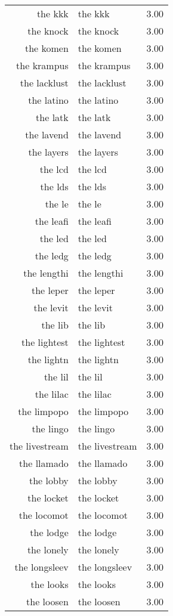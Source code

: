 \begin{table}[ht]
\begin{tabular}{rlr}
  the kkk & the kkk & 3.00 \\ 
  the knock & the knock & 3.00 \\ 
  the komen & the komen & 3.00 \\ 
  the krampus & the krampus & 3.00 \\ 
  the lacklust & the lacklust & 3.00 \\ 
  the latino & the latino & 3.00 \\ 
  the latk & the latk & 3.00 \\ 
  the lavend & the lavend & 3.00 \\ 
  the layers & the layers & 3.00 \\ 
  the lcd & the lcd & 3.00 \\ 
  the lds & the lds & 3.00 \\ 
  the le & the le & 3.00 \\ 
  the leafi & the leafi & 3.00 \\ 
  the led & the led & 3.00 \\ 
  the ledg & the ledg & 3.00 \\ 
  the lengthi & the lengthi & 3.00 \\ 
  the leper & the leper & 3.00 \\ 
  the levit & the levit & 3.00 \\ 
  the lib & the lib & 3.00 \\ 
  the lightest & the lightest & 3.00 \\ 
  the lightn & the lightn & 3.00 \\ 
  the lil & the lil & 3.00 \\ 
  the lilac & the lilac & 3.00 \\ 
  the limpopo & the limpopo & 3.00 \\ 
  the lingo & the lingo & 3.00 \\ 
  the livestream & the livestream & 3.00 \\ 
  the llamado & the llamado & 3.00 \\ 
  the lobby & the lobby & 3.00 \\ 
  the locket & the locket & 3.00 \\ 
  the locomot & the locomot & 3.00 \\ 
  the lodge & the lodge & 3.00 \\ 
  the lonely & the lonely & 3.00 \\ 
  the longsleev & the longsleev & 3.00 \\ 
  the looks & the looks & 3.00 \\ 
  the loosen & the loosen & 3.00 \\ 

\end{tabular}
\end{table}
